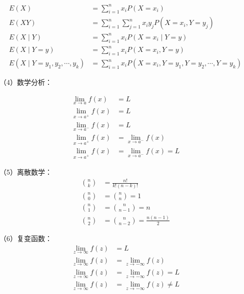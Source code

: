 \documentclass[UTF8, zihao = -4, linespread = 1.335, heading = true, fontset = fandol]{ctexart}
\begin{document}
\begin{equation}
    \begin{split}
        E(X) &= \sum_{i=1}^n x_iP(X=x_i) \\
        E(XY) &= \sum_{i=1}^n \sum_{j=1}^n x_iy_jP(X=x_i,Y=y_j) \\
        E(X \mid Y) &= \sum_{i=1}^n x_iP(X=x_i \mid Y=y) \\
        E(X \mid Y=y) &= \sum_{i=1}^n x_iP(X=x_i,Y=y) \\
        E(X \mid Y=y_1,y_2,\cdots,y_k) &= \sum_{i=1}^n x_iP(X=x_i,Y=y_1,Y=y_2,\cdots,Y=y_k)
    \end{split}
\end{equation}

（4）数学分析：

\begin{equation}
    \begin{split}
        \lim_{x \to a}f(x) &= L \\
        \lim_{x \to a^+}f(x) &= L \\
        \lim_{x \to a^-}f(x) &= L \\
        \lim_{x \to a^+}f(x) &= \lim_{x \to a^-}f(x) \\
        \lim_{x \to a^+}f(x) &= \lim_{x \to a^-}f(x) = L
    \end{split}
\end{equation}

（5）离散数学：
\begin{equation}
    \begin{split}
        \binom{n}{k} &= \frac{n!}{k!(n-k)!} \\
        \binom{n}{0} &= \binom{n}{n} = 1 \\
        \binom{n}{1} &= \binom{n}{n-1} = n \\
        \binom{n}{2} &= \binom{n}{n-2} = \frac{n(n-1)}{2}
    \end{split}
\end{equation}

（6）复变函数：
\begin{equation}
    \begin{split}
        \lim_{z \to \infty}f(z) &= L \\
        \lim_{z \to \infty}f(z) &= \lim_{z \to -\infty}f(z) \\
        \lim_{z \to \infty}f(z) &= \lim_{z \to -\infty}f(z) = L \\
        \lim_{z \to \infty}f(z) &= \lim_{z \to -\infty}f(z) \neq L
    \end{split}
\end{equation}
\end{document}
